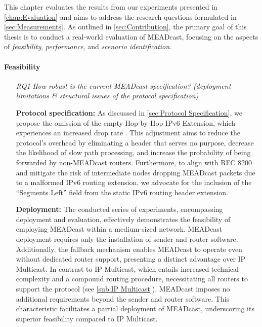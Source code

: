 This chapter evaluates the results from our experiments presented in
    \autoref{chap:Evaluation} and aims to address the research questions
    formulated in \autoref{sec:Measurements}.
As outlined in \autoref{sec:Contribution}, the primary goal of this thesis is
    to conduct a real-world evaluation of MEADcast, focusing on the aspects of
    \textit{feasibility}, \textit{performance}, and \textit{scenario
    identification}.

\paragraph{Feasibility} %
\label{par:discussion_Feasibility}
\begin{itemize}
\item[\textit{RQ1}]
    \textit{How robust is the current MEADcast specification? (deployment
        limitations \& structural issues of the protocol specification)}\par
    \textbf{Protocol specification:}
    As discussed in \autoref{sec:Protocol Specification}, we propose the
        omission of the empty Hop-by-Hop IPv6 Extension, which experiences an
        increased drop rate \cite{rfc7872_ext_hdrs_drop_rate}.
    This adjustment aims to reduce the protocol's overhead by eliminating a
        header that serves no purpose, decrease the likelihood of slow path
        processing, and increase the probability of being forwarded by
        non-MEADcast routers.
    Furthermore, to align with RFC 8200 \cite{rfc8200_ipv6_hdr} and mitigate
        the risk of intermediate nodes dropping MEADcast packets due to a
        malformed IPv6 routing extension, we advocate for the inclusion of the
        ``Segments Left'' field from the static IPv6 routing header extension.

    \textbf{Deployment:}
    The conducted series of experiments, encompassing deployment and evaluation,
        effectively demonstrates the feasibility of employing MEADcast within a
        medium-sized network.
    MEADcast deployment requires only the installation of sender and router
        software.
    Additionally, the fallback mechanism enables MEADcast to operate even
        without dedicated router support, presenting a distinct advantage over
        IP Multicast.
    In contrast to IP Multicast, which entails increased technical complexity
        and a compound routing procedure, necessitating all routers to support
        the protocol (see \autoref{sub:IP Multicast}), MEADcast imposes no
        additional requirements beyond the sender and router software.
    This characteristic facilitates a partial deployment of MEADcast,
        underscoring its superior feasibility compared to IP Multicast.


\end{itemize}
